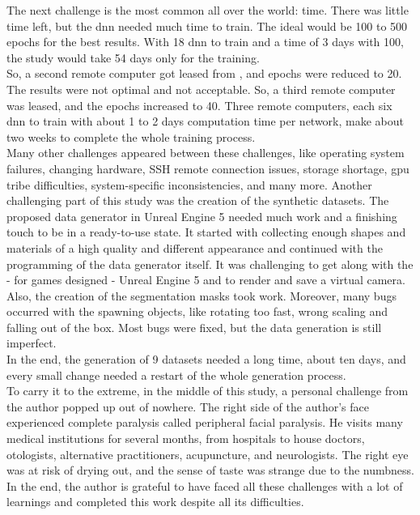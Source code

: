 		The next challenge is the most common all over the world: time. There was little time left, but the \ac{dnn} needed much time to train. The ideal would be 100 to 500 epochs for the best results. With 18 \ac{dnn} to train and a time of 3 days with 100, the study would take 54 days only for the training.\\
		So, a second remote computer got leased from \cite{shadow}, and epochs were reduced to 20. The results were not optimal and not acceptable. So, a third remote computer was leased, and the epochs increased to 40. Three remote computers, each six \ac{dnn} to train with about 1 to 2 days computation time per network, make about two weeks to complete the whole training process. \\
		Many other challenges appeared between these challenges, like operating system failures, changing hardware, SSH remote connection issues, storage shortage, \ac{gpu} tribe difficulties,  system-specific inconsistencies, and many more.
		\clearpage
		Another challenging part of this study was the creation of the synthetic datasets. The proposed data generator in Unreal Engine 5 needed much work and a finishing touch to be in a ready-to-use state. It started with collecting enough shapes and materials of a high quality and different appearance and continued with the programming of the data generator itself. It was challenging to get along with the - for games designed - Unreal Engine 5 and to render and save a virtual camera. Also, the creation of the segmentation masks took work. Moreover, many bugs occurred with the spawning objects, like rotating too fast, wrong scaling and falling out of the box. Most bugs were fixed, but the data generation is still imperfect.\\
		In the end, the generation of 9 datasets needed a long time, about ten days, and every small change needed a restart of the whole generation process.\\
		To carry it to the extreme, in the middle of this study, a personal challenge from the author popped up out of nowhere. The right side of the author's face experienced complete paralysis called peripheral facial paralysis. He visits many medical institutions for several months, from hospitals to house doctors, otologists, alternative practitioners, acupuncture, and neurologists. The right eye was at risk of drying out, and the sense of taste was strange due to the numbness. \\
		In the end, the author is grateful to have faced all these challenges with a lot of learnings and completed this work despite all its difficulties.\\
